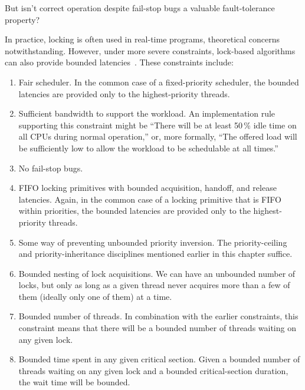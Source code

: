 \QuickQuiz{}
	But isn't correct operation despite fail-stop bugs
	a valuable fault-tolerance property?
 \QuickQuizEnd

In practice, locking is often used in real-time programs, theoretical
concerns notwithstanding.
However, under more severe constraints, lock-based
algorithms can also provide bounded latencies~\cite{BjoernBrandenburgPhD}.
These constraints include:

\begin{enumerate}
\item	Fair scheduler.
	In the common case of a fixed-priority scheduler, the bounded
	latencies are provided only to the highest-priority threads.
\item	Sufficient bandwidth to support the workload.
	An implementation rule supporting this constraint might be
	``There will be at least 50\,\% idle time on all CPUs
	during normal operation,''
	or, more formally, ``The offered load will be sufficiently low
	to allow the workload to be schedulable at all times.''
\item	No fail-stop bugs.
\item	FIFO locking primitives with bounded acquisition, handoff,
	and release latencies.
	Again, in the common case of a locking primitive that is FIFO
	within priorities, the bounded latencies are provided only
	to the highest-priority threads.
\item	Some way of preventing unbounded priority inversion.
	The priority-ceiling and priority-inheritance disciplines
	mentioned earlier in this chapter suffice.
\item	Bounded nesting of lock acquisitions.
	We can have an unbounded number of locks, but only as long as a
	given thread never acquires more than a few of them (ideally only
	one of them) at a time.
\item	Bounded number of threads.
	In combination with the earlier constraints, this constraint means
	that there will be a bounded number of threads waiting on any
	given lock.
\item	Bounded time spent in any given critical section.
	Given a bounded number of threads waiting on any given lock and
	a bounded critical-section duration, the wait time will be bounded.
\end{enumerate}

